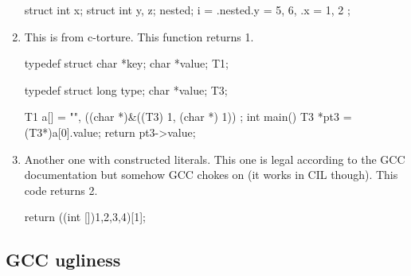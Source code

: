 \documentclass{article}
\begin{document}
\begin{enumerate}
\begin{cilcode}[global]
struct { 
   int x; 
   struct { 
       int y, z; 
   } nested;
} i = { .nested.y = 5, 6, .x = 1, 2 };               
\end{cilcode}

\item This is from c-torture. This function returns 1.

\begin{cilcode}[global]
typedef struct
{
  char *key;
  char *value;
} T1;

typedef struct
{
  long type;
  char *value;
} T3;

T1 a[] =
{
  {
    "",
    ((char *)&((T3) {1, (char *) 1}))
  }
};
int main() {
   T3 *pt3 = (T3*)a[0].value;
   return pt3->value;
}
\end{cilcode}

\item Another one with constructed literals. This one is legal according to
the GCC documentation but somehow GCC chokes on (it works in CIL though). This
code returns 2.

\begin{cilcode}[local]
 return ((int []){1,2,3,4})[1];
\end{cilcode}

\end{enumerate}

 \subsection{GCC ugliness}\label{sec-ugly-gcc}
\end{document}
